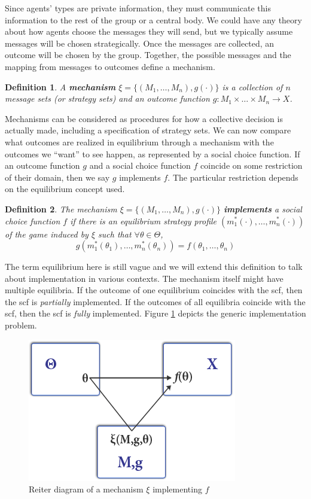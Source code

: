 \documentclass[letter, 10pt]{article}
\theoremstyle{basic}
\newtheorem{definition}{Definition}[section]
\begin{document}
\begin{spacing}{1.0}
Since agents' types are private information, they must communicate this
information to the rest of the group or a central body. We could have any
theory about how agents choose the messages they will send, but we
typically assume messages will be chosen strategically. Once the messages
are collected, an outcome will be chosen by the group. Together, the
possible messages and the mapping from messages to outcomes define a
mechanism.

\begin{definition}
  A \textbf{mechanism} $\xi = \{(M_1, \ldots, M_n),
  g(\cdot)\}$ is a collection of $n$ message sets (or
  strategy sets) and an outcome function $g: M_1 \times
  \ldots \times M_n \to X$.
\end{definition}

Mechanisms can be considered as procedures for how a
collective decision is actually made, including a specification of
strategy sets. We can now compare what outcomes are
realized in equilibrium through a mechanism with the
outcomes we ``want'' to see happen, as represented by a
social choice function. If an outcome function $g$ and
a social choice function $f$ coincide on some restriction
of their domain, then we say $g$ implements $f$. The
particular restriction depends on the equilibrium concept used.

\begin{definition}
  The mechanism $\xi = \{(M_1, \ldots, M_n),
  g(\cdot)\}$ \textbf{implements} a social choice function $f$ if
  there is an equilibrium strategy profile
  $(m_1^*(\cdot), \ldots, m_n^*(\cdot))$ of the game
  induced by $\xi$ such that $\forall \theta \in \Theta$,
  \[g(m_1^*(\theta_1), \ldots, m_n^*(\theta_n)) =
  f(\theta_1, \ldots, \theta_n)\]
\end{definition}

The term equilibrium here is still vague and we will extend this definition
to talk about implementation in various contexts. The mechanism itself
might have multiple equilibria. If the outcome of one equilibrium coincides
with the scf, then the scf is \textit{partially} implemented. If the
outcomes of all equilibria coincide with the scf, then the scf is
\textit{fully} implemented.  Figure \ref{reiterdiagram} depicts the generic
implementation problem.


\begin{figure}[ht!]
  \centering
  \includegraphics[width=.45\columnwidth]{reiterdiagram}
    \caption{Reiter diagram of a
  mechanism $\xi$ implementing $f$}
\label{reiterdiagram}
\end{figure}


\end{spacing}
\end{document}
